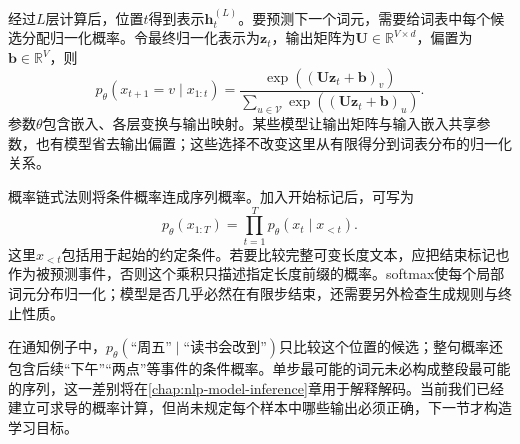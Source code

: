 经过$L$层计算后，位置$t$得到表示$\bm h_t^{(L)}$。要预测下一个词元，需要给词表中每个候选分配归一化概率。令最终归一化表示为$\bm z_t$，输出矩阵为$\bm U\in\mathbb R^{V\times d}$，偏置为$\bm b\in\mathbb R^V$，则
\begin{equation}
 p_\theta(x_{t+1}=v\mid x_{1:t})=
 \frac{\exp((\bm U\bm z_t+\bm b)_v)}
 {\sum_{u\in\mathcal V}\exp((\bm U\bm z_t+\bm b)_u)}.
 \label{eq:nlp-llm-softmax}
\end{equation}
参数$\theta$包含嵌入、各层变换与输出映射。某些模型让输出矩阵与输入嵌入共享参数，也有模型省去输出偏置；这些选择不改变这里从有限得分到词表分布的归一化关系。

概率链式法则将条件概率连成序列概率。加入开始标记后，可写为
\begin{equation}
 p_\theta(x_{1:T})=\prod_{t=1}^{T}
 p_\theta(x_t\mid x_{<t}).
 \label{eq:nlp-llm-sequence-probability}
\end{equation}
这里$x_{<t}$包括用于起始的约定条件。若要比较完整可变长度文本，应把结束标记也作为被预测事件，否则这个乘积只描述指定长度前缀的概率。softmax使每个局部词元分布归一化；模型是否几乎必然在有限步结束，还需要另外检查生成规则与终止性质。

在通知例子中，$p_\theta(\text{“周五”}\mid\text{“读书会改到”})$只比较这个位置的候选；整句概率还包含后续“下午”“两点”等事件的条件概率。单步最可能的词元未必构成整段最可能的序列，这一差别将在\ref{chap:nlp-model-inference}章用于解释解码。当前我们已经建立可求导的概率计算，但尚未规定每个样本中哪些输出必须正确，下一节才构造学习目标。
